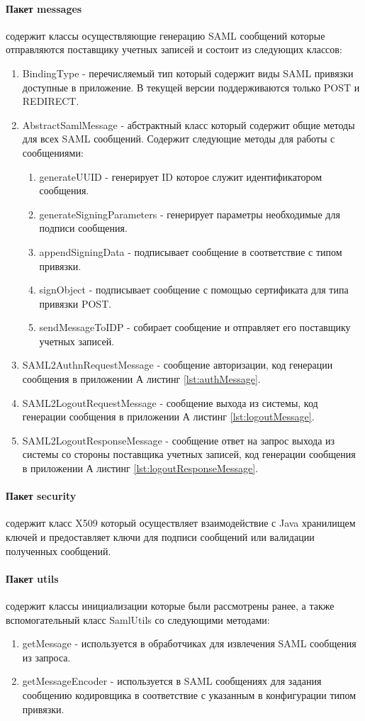 \paragraph{Пакет messages} содержит классы осуществляющие генерацию SAML сообщений которые отправляются поставщику учетных записей и состоит из следующих классов:
\begin{enumerate}
\item BindingType - перечисляемый тип который содержит виды SAML привязки доступные в приложение. В текущей версии поддерживаются только POST и REDIRECT.
\item AbstractSamlMessage - абстрактный класс который содержит общие методы для всех SAML сообщений. Содержит следующие методы для работы с сообщениями:
\begin{enumerate}
\item generateUUID - генерирует ID которое служит идентификатором сообщения.
\item generateSigningParameters - генерирует параметры необходимые для подписи сообщения.
\item appendSigningData - подписывает сообщение в соответствие с типом привязки.
\item signObject - подписывает сообщение с помощью сертификата для типа привязки POST.
\item sendMessageToIDP - собирает сообщение и отправляет его поставщику учетных записей.
\end{enumerate}
\item SAML2AuthnRequestMessage - сообщение авторизации, код генерации сообщения в приложении А листинг \ref{lst:authMessage}.
\item SAML2LogoutRequestMessage - сообщение выхода из системы, код генерации сообщения в приложении А листинг \ref{lst:logoutMessage}.
\item SAML2LogoutResponseMessage - сообщение ответ на запрос выхода из системы со стороны поставщика учетных записей, код генерации сообщения в приложении А листинг \ref{lst:logoutResponseMessage}.
\end{enumerate}
\paragraph{Пакет security} содержит класс X509 который осуществляет взаимодействие с Java хранилищем ключей и предоставляет ключи для подписи сообщений или валидации полученных сообщений.
\paragraph{Пакет utils} содержит классы инициализации которые были рассмотрены ранее, а также вспомогательный класс SamlUtils со следующими методами:
\begin{enumerate}
\item getMessage - используется в обработчиках для извлечения SAML сообщения из запроса.
\item getMessageEncoder - используется в SAML сообщениях для задания сообщению кодировщика в соответствие с указанным в конфигурации типом  привязки.
\end{enumerate}
